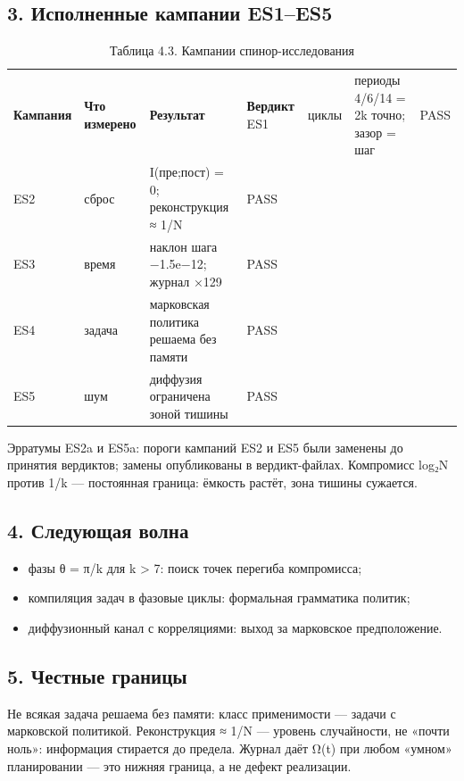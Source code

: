 \documentclass[11pt,a4paper]{article}
\begin{document}
\subsection{3. Исполненные кампании ES1–ES5}

\begin{table}[htbp]\centering\small
\caption{Таблица 4.3. Кампании спинор-исследования}
\begin{tabular}{p{} p{} p{} p{}}
\toprule
\textbf{Кампания} & \textbf{Что измерено} & \textbf{Результат} & \textbf{Вердикт}
\midrule
ES1 & циклы & периоды 4/6/14 = 2k точно; зазор = шаг & PASS \\
ES2 & сброс & I(пре;пост) = 0; реконструкция ≈ 1/N & PASS \\
ES3 & время & наклон шага −1.5e−12; журнал ×129 & PASS \\
ES4 & задача & марковская политика решаема без памяти & PASS \\
ES5 & шум & диффузия ограничена зоной тишины & PASS \\
\bottomrule
\end{tabular}
\end{table}

Эрратумы ES2a и ES5a: пороги кампаний ES2 и ES5 были заменены до принятия вердиктов; замены опубликованы в вердикт-файлах. Компромисс log₂N против 1/k — постоянная граница: ёмкость растёт, зона тишины сужается.

\subsection{4. Следующая волна}

\begin{itemize}
  \item фазы θ = π/k для k > 7: поиск точек перегиба компромисса;
  \item компиляция задач в фазовые циклы: формальная грамматика политик;
  \item диффузионный канал с корреляциями: выход за марковское предположение.
\end{itemize}

\subsection{5. Честные границы}

Не всякая задача решаема без памяти: класс применимости — задачи с марковской политикой. Реконструкция ≈ 1/N — уровень случайности, не «почти ноль»: информация стирается до предела. Журнал даёт Ω(t) при любом «умном» планировании — это нижняя граница, а не дефект реализации.
\end{document}
